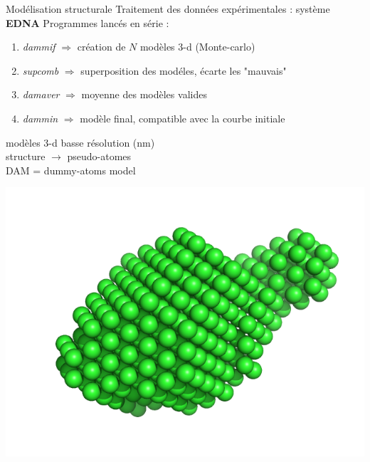 \documentclass{beamer}
\begin{document}
\begin{frame}{Mod\'elisation structurale}
Traitement des donn\'ees exp\'erimentales : syst\`eme \textbf{EDNA}
Programmes lanc\'es en s\'erie : 
\begin{enumerate}
  \item \textit{dammif} $\Rightarrow$ cr\'eation de $N$ mod\`eles 3-d 
    (Monte-carlo)
  \item \textit{supcomb} $\Rightarrow$ superposition des mod\'eles, \'ecarte 
    les "mauvais"
  \item \textit{damaver} $\Rightarrow$ moyenne des mod\`eles valides
  \item \textit{dammin} $\Rightarrow$ mod\`ele final, compatible avec la 
    courbe initiale
\end{enumerate}

\begin{minipage}{0.50\linewidth}
    mod\`eles 3-d basse r\'esolution (nm)\\
    structure $\rightarrow$ pseudo-atomes\\
    DAM = dummy-atoms model
\end{minipage}
\begin{minipage}{0.45\linewidth}
    \begin{center}
    \vspace{-0.3cm}
    \hspace{-0.4cm}
    \includegraphics[scale=0.3]{model.png}
    \end{center}
\end{minipage}

\end{frame}
\end{document}
